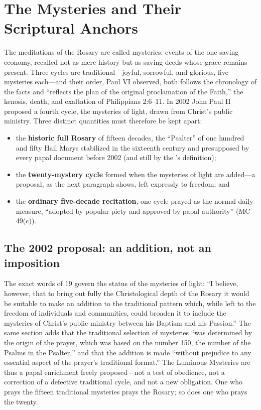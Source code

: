 \section{The Mysteries and Their Scriptural Anchors}
\label{sec:mysteries}

The meditations of the Rosary are called mysteries: events of the one
saving economy, recalled not as mere history but as saving deeds whose
grace remains present. Three cycles are traditional---joyful, sorrowful,
and glorious, five mysteries each---and their order, Paul VI observed,
both follows the chronology of the facts and ``reflects the plan of the
original proclamation of the Faith,'' the kenosis, death, and exaltation
of Philippians 2:6--11. In 2002 John Paul II proposed a
fourth cycle, the mysteries of light, drawn from Christ's public
ministry. Three distinct quantities must therefore be kept apart:

\begin{itemize}
\item the \textbf{historic full Rosary} of fifteen decades, the
``Psalter'' of one hundred and fifty Hail Marys stabilized in the
sixteenth century and presupposed by every papal document before 2002
(and still by the 's definition);
\item the \textbf{twenty-mystery cycle} formed when the mysteries of
light are added---a proposal, as the next paragraph shows, left
expressly to freedom; and
\item the \textbf{ordinary five-decade recitation}, one cycle prayed as
the normal daily measure, ``adopted by popular piety and approved by
papal authority'' (MC 49(c)).
\end{itemize}

\subsection{The 2002 proposal: an addition, not an imposition}

The exact words of  19 govern the status
of the mysteries of light: ``I believe, however, that to bring out fully
the Christological depth of the Rosary it would be suitable to make an
addition to the traditional pattern which, while left to the freedom of
individuals and communities, could broaden it to include the mysteries
of Christ's public ministry between his Baptism and his Passion.'' The
same section adds that the traditional selection of mysteries ``was
determined by the origin of the prayer, which was based on the number
150, the number of the Psalms in the Psalter,'' and that the addition is
made ``without prejudice to any essential aspect of the prayer's
traditional format.'' The Luminous Mysteries are
thus a papal enrichment freely proposed---not a test of obedience, not a
correction of a defective traditional cycle, and not a new obligation.
One who prays the fifteen traditional mysteries prays the Rosary; so
does one who prays the twenty.

